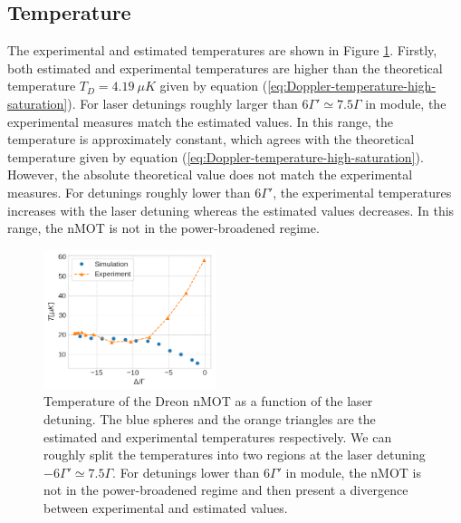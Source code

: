 \subsection{Temperature}
\label{temperature}

The experimental and estimated temperatures are shown in Figure \ref{fig:Dreon-temperature}. Firstly, both estimated and experimental temperatures are higher than the theoretical temperature $ T_D = 4.19\ \mu K $ given by equation (\ref{eq:Doppler-temperature-high-saturation}). For laser detunings roughly larger than $ 6 \Gamma' \simeq 7.5 \Gamma $ in module, the experimental measures match the estimated values. In this range, the temperature is approximately constant, which agrees with the theoretical temperature given by equation (\ref{eq:Doppler-temperature-high-saturation}). However, the absolute theoretical value does not match the experimental measures. For detunings roughly lower than $ 6 \Gamma' $, the experimental temperatures increases with the laser detuning whereas the estimated values decreases. In this range, the nMOT is not in the power-broadened regime.

\begin{figure}[!ht]
    \centering
    \includegraphics[width=0.45\textwidth]{USPSC-img/dy_temperature.png}
    \vspace{5px}
    \caption{Temperature of the Dreon nMOT as a function of the laser detuning. The blue spheres and the orange triangles are the estimated and experimental temperatures respectively. We can roughly split the temperatures into two regions at the laser detuning $ -6 \Gamma' \simeq 7.5 \Gamma $. For detunings lower than $ 6 \Gamma'  $ in module, the nMOT is not in the power-broadened regime and then present a divergence between experimental and estimated values.}
    \label{fig:Dreon-temperature}
\end{figure}
